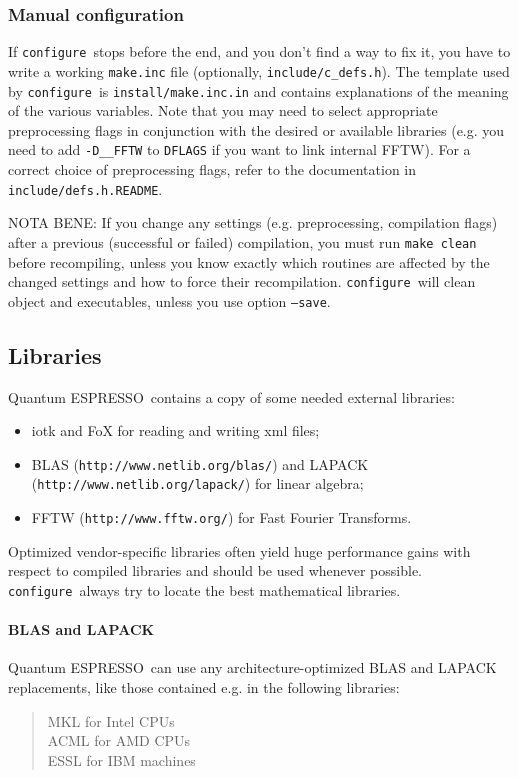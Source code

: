 \documentclass[12pt,a4paper]{article}
\def\qe{{\sc Quantum ESPRESSO}}
\def\configure{\texttt{configure}}
\begin{document}
\subsubsection{Manual configuration}
\label{SubSec:manconf}
If \configure\ stops before the end, and you don't find a way to fix
it, you have to write a working \texttt{make.inc} file (optionally,
\texttt{include/c\_defs.h}). The template used by \configure\ is
\texttt{install/make.inc.in} and contains explanations of the meaning
of the various variables. Note that you may need
to select appropriate preprocessing flags
in conjunction with the desired or available
libraries (e.g. you need to add \texttt{-D\_\_FFTW} to \texttt{DFLAGS}
if you want to link internal FFTW). For a correct choice of preprocessing
flags, refer to the documentation in \texttt{include/defs.h.README}.

NOTA BENE: If you change any settings (e.g. preprocessing,
compilation flags)
after a previous (successful or failed) compilation, you must run
\texttt{make clean} before recompiling, unless you know exactly which
routines are affected by the changed settings and how to force their
recompilation. \configure\ will clean object and executables, unless
you use option \texttt{--save}.

\subsection{Libraries}
\label{Sec:Libraries}

\qe\ contains a copy of some needed external libraries:
\begin{itemize}
 \item iotk and FoX for reading and writing xml files;
 \item BLAS (\texttt{http://www.netlib.org/blas/}) and LAPACK
  (\texttt{http://www.netlib.org/lapack/}) for linear algebra;
\item FFTW (\texttt{http://www.fftw.org/}) for Fast Fourier Transforms.
\end{itemize}
Optimized vendor-specific libraries often yield huge performance gains
with respect to compiled libraries and should be used whenever
possible. \configure\ always try to locate the best mathematical
libraries.
\\

\paragraph{BLAS and LAPACK}
\qe\ can use any architecture-optimized BLAS and LAPACK replacements,
like those contained e.g. in the following libraries:
\begin{quote}
MKL for Intel CPUs\\
ACML for AMD CPUs\\
ESSL for IBM machines\\
\end{quote}
\end{document}
